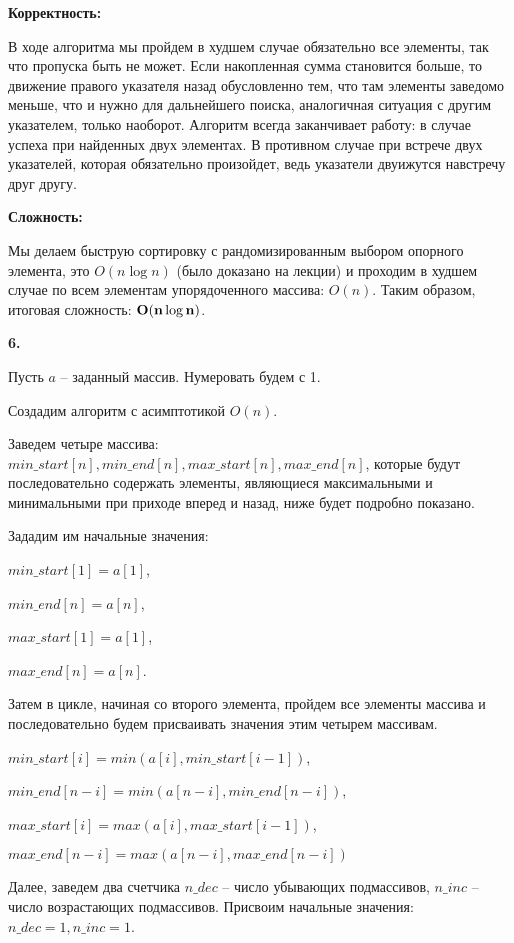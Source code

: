 \documentclass[12pt]{extreport}
\begin{document}
\bigskip 
{\bf Корректность:}

В ходе алгоритма мы пройдем в худшем случае обязательно все элементы, так что пропуска быть не может. Если накопленная сумма становится больше, то движение правого указателя назад обусловленно тем, что там элементы заведомо меньше, что и нужно для дальнейшего поиска, аналогичная ситуация с другим указателем, только наоборот. Алгоритм всегда заканчивает работу: в случае успеха при найденных двух элементах. В противном случае при встрече двух указателей, которая обязательно произойдет, ведь указатели двуижутся навстречу друг другу. 

\bigskip 
{\bf Сложность:} 

Мы делаем быструю сортировку с рандомизированным выбором опорного элемента, это $O(n \log n)$ (было доказано на лекции) и проходим в худшем случае по всем элементам упорядоченного массива: $O(n)$. Таким образом, итоговая сложность: $\bf{O(n \log n)}$.

\bigskip 

{\bf 6.} 

Пусть $a$ -- заданный массив. Нумеровать будем с 1.

Создадим алгоритм с асимптотикой $O(n)$.

Заведем четыре массива: $min\_start[n], min\_end[n], max\_start[n], max\_end[n]$, которые будут последовательно содержать элементы, являющиеся максимальными и минимальными при приходе вперед и назад, ниже будет подробно показано. 

Зададим им начальные значения: 

$min\_start[1] = a[1]$, 

$min\_end[n] = a[n]$, 

$max\_start[1] = a[1]$, 

$max\_end[n] = a[n]$.

Затем в цикле, начиная со второго элемента, пройдем все элементы массива и последовательно будем присваивать значения этим четырем массивам. 

$min\_start[i] = min(a[i], min\_start[i-1])$,

$min\_end[n-i] = min(a[n-i], min\_end[n-i])$, 

$max\_start[i] = max(a[i], max\_start[i-1])$, 

$max\_end[n-i] = max(a[n-i], max\_end[n-i])$

Далее, заведем два счетчика $n\_dec$ -- число убывающих подмассивов, $n\_inc$ -- число возрастающих подмассивов. Присвоим начальные значения: $n\_dec =1, n\_inc =1$.
\end{document}
